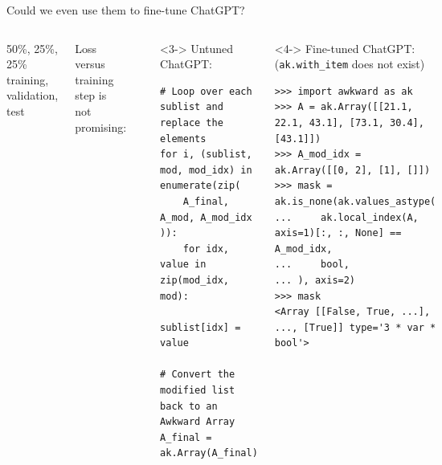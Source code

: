 \documentclass[aspectratio=169]{beamer}
\begin{document}
\begin{frame}[fragile]{Could we even use them to fine-tune ChatGPT?}
\vspace{0.35 cm}
\begin{columns}
50\%, 25\%, 25\% training, validation, test

\vspace{0.25 cm}
Loss versus training step is not promising:

\vspace{0.25 cm}
\includegraphics[width=\linewidth]{PLOTS/stackoverflow-finetune-loss.pdf}

\vspace{0.25 cm}

\begin{uncoverenv}<3->
Untuned ChatGPT:

\tiny
\vspace{0.1 cm}
\begin{verbatim}
# Loop over each sublist and replace the elements
for i, (sublist, mod, mod_idx) in enumerate(zip(
    A_final, A_mod, A_mod_idx
)):
    for idx, value in zip(mod_idx, mod):
        sublist[idx] = value

# Convert the modified list back to an Awkward Array
A_final = ak.Array(A_final)
\end{verbatim}
\end{uncoverenv}

\vspace{0.25 cm}
\begin{uncoverenv}<4->
\normalsize
Fine-tuned ChatGPT: {\scriptsize (\texttt{ak.with_item} does not exist)}

\tiny
\vspace{0.1 cm}
\begin{verbatim}
>>> import awkward as ak
>>> A = ak.Array([[21.1, 22.1, 43.1], [73.1, 30.4], [43.1]])
>>> A_mod_idx = ak.Array([[0, 2], [1], []])
>>> mask = ak.is_none(ak.values_astype(
...     ak.local_index(A, axis=1)[:, :, None] == A_mod_idx,
...     bool,
... ), axis=2)
>>> mask
<Array [[False, True, ...], ..., [True]] type='3 * var * bool'>


\end{verbatim}
\end{uncoverenv}
\end{columns}
\end{frame}
\end{document}
